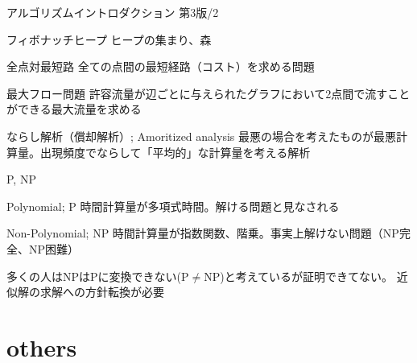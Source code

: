 \documentclass{beamer}
\begin{document}
\begin{frame}[fragile]{アルゴリズムイントロダクション 第3版/2}{
\href{https://www.amazon.co.jp/アルゴリズムイントロダクション-第3版-総合版：世界標準MIT教科書-Thomas-Cormen-ebook/dp/B078WPYHGN/ref=sr_1_10}{}}

\begin{block}{フィボナッチヒープ}
ヒープの集まり、森
\end{block}

\begin{block}{全点対最短路}
全ての点間の最短経路（コスト）を求める問題
\end{block}

\begin{block}{最大フロー問題}
許容流量が辺ごとに与えられたグラフにおいて2点間で流すことができる最大流量を求める
\end{block}

\begin{block}{ならし解析（償却解析）; Amoritized analysis}
最悪の場合を考えたものが最悪計算量。出現頻度でならして「平均的」な計算量を考える解析
\end{block}

\end{frame}

\begin{frame}[fragile]{P, NP}{}
\begin{block}{Polynomial; P}
時間計算量が多項式時間。解ける問題と見なされる
\end{block}

\begin{block}{Non-Polynomial; NP}
時間計算量が指数関数、階乗。事実上解けない問題（NP完全、NP困難）
\end{block}

\vfill
多くの人はNPはPに変換できない(P$\neq$NP)と考えているが証明できてない。
\vfill
近似解の求解への方針転換が必要
\end{frame}


\section{others}		%
\subsection{}
\end{document}
